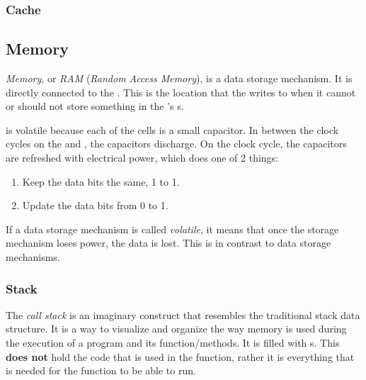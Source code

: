\subsubsection{Cache}\label{subsubsec:CPU_Cache}

\subsection{Memory}\label{subsec:Memory}
\begin{definition}[Memory]\label{def:Memory}
  \emph{Memory}, or \emph{RAM} (\emph{Random Access Memory}), is a  data storage mechanism.
  It is directly connected to the .
  This is the location that the  writes to when it cannot or should not store something in the 's s.

  \begin{remark}[Volatility]
     is volatile because each of the cells is a small capacitor.
    In between the clock cycles on the  and , the capacitors discharge.
    On the clock cycle, the capacitors are refreshed with electrical power, which does one of 2 things:
    \begin{enumerate}[noitemsep]
    \item Keep the data bits the same, 1 to 1.
    \item Update the data bits from 0 to 1.
    \end{enumerate}
  \end{remark}
\end{definition}

\begin{definition}[Volatile]\label{def:Volatile}
  If a data storage mechanism is called \emph{volatile}, it means that once the storage mechanism loses power, the data is lost.
  This is in contrast to  data storage mechanisms.
\end{definition}

\subsubsection{Stack}\label{subsubsec:Memory_Stack}
\begin{definition}\label{def:Call_Stack}
  The \emph{call stack} is an imaginary construct that resembles the traditional stack data structure.
  It is a way to visualize and organize the way memory is used during the execution of a program and its function/methods.
  It is filled with s.
  This \textbf{does not} hold the code that is used in the function, rather it is everything that is needed for the function to be able to run.
\end{definition}

